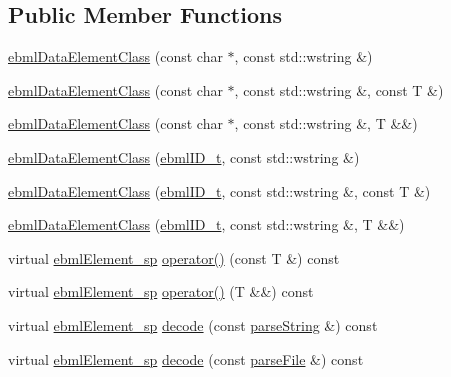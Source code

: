 \subsection*{Public Member Functions}
\begin{DoxyCompactItemize}
\item 
\mbox{\hyperlink{classebml_1_1ebmlDataElementClass_3_01const_01T_01_4_ad773b2b4c45bcb51ebfcba12d4888de2}{ebml\+Data\+Element\+Class}} (const char $\ast$, const std\+::wstring \&)
\item 
\mbox{\hyperlink{classebml_1_1ebmlDataElementClass_3_01const_01T_01_4_a99c231404d053be2783f12671428baa5}{ebml\+Data\+Element\+Class}} (const char $\ast$, const std\+::wstring \&, const T \&)
\item 
\mbox{\hyperlink{classebml_1_1ebmlDataElementClass_3_01const_01T_01_4_a6520906c14ba70894272b26833de66c9}{ebml\+Data\+Element\+Class}} (const char $\ast$, const std\+::wstring \&, T \&\&)
\item 
\mbox{\hyperlink{classebml_1_1ebmlDataElementClass_3_01const_01T_01_4_a83d68654ada83eb978d50133b93df485}{ebml\+Data\+Element\+Class}} (\mbox{\hyperlink{namespaceebml_a86c5f604ddf12a74aa9812e997a58691}{ebml\+I\+D\+\_\+t}}, const std\+::wstring \&)
\item 
\mbox{\hyperlink{classebml_1_1ebmlDataElementClass_3_01const_01T_01_4_afabeada87b7b2a7fd9a5944b8534cb5d}{ebml\+Data\+Element\+Class}} (\mbox{\hyperlink{namespaceebml_a86c5f604ddf12a74aa9812e997a58691}{ebml\+I\+D\+\_\+t}}, const std\+::wstring \&, const T \&)
\item 
\mbox{\hyperlink{classebml_1_1ebmlDataElementClass_3_01const_01T_01_4_a2b30da4fc5e2e00ee773db25db952704}{ebml\+Data\+Element\+Class}} (\mbox{\hyperlink{namespaceebml_a86c5f604ddf12a74aa9812e997a58691}{ebml\+I\+D\+\_\+t}}, const std\+::wstring \&, T \&\&)
\item 
virtual \mbox{\hyperlink{namespaceebml_adad533b7705a16bb360fe56380c5e7be}{ebml\+Element\+\_\+sp}} \mbox{\hyperlink{classebml_1_1ebmlDataElementClass_3_01const_01T_01_4_a7873f495e6b29cca5f3d73e0e34873f5}{operator()}} (const T \&) const
\item 
virtual \mbox{\hyperlink{namespaceebml_adad533b7705a16bb360fe56380c5e7be}{ebml\+Element\+\_\+sp}} \mbox{\hyperlink{classebml_1_1ebmlDataElementClass_3_01const_01T_01_4_ab7167a66c766cc253d32fca44856c70e}{operator()}} (T \&\&) const
\item 
virtual \mbox{\hyperlink{namespaceebml_adad533b7705a16bb360fe56380c5e7be}{ebml\+Element\+\_\+sp}} \mbox{\hyperlink{classebml_1_1ebmlDataElementClass_3_01const_01T_01_4_a02806c600c51c291303fbac56d9db70a}{decode}} (const \mbox{\hyperlink{classebml_1_1parseString}{parse\+String}} \&) const
\item 
virtual \mbox{\hyperlink{namespaceebml_adad533b7705a16bb360fe56380c5e7be}{ebml\+Element\+\_\+sp}} \mbox{\hyperlink{classebml_1_1ebmlDataElementClass_3_01const_01T_01_4_a8e55ca5bba1f4406920f75cd9b0e9bbc}{decode}} (const \mbox{\hyperlink{classebml_1_1parseFile}{parse\+File}} \&) const
\end{DoxyCompactItemize}
